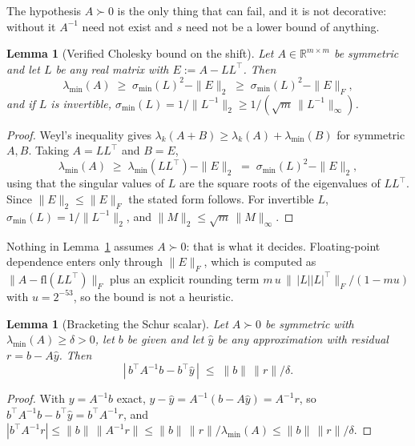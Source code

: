 \documentclass[11pt,a4paper]{article}
\theoremstyle{plain}
\newtheorem{lemma}[theorem]{Lemma}
\theoremstyle{definition}
\theoremstyle{remark}
\newcommand{\abs}[1]{\left\lvert #1\right\rvert}
\newcommand{\R}{\mathbb{R}}
\begin{document}
The hypothesis $A\succ0$ is the only thing that can fail, and it is not decorative:
without it $A^{-1}$ need not exist and $s$ need not be a lower bound of anything.

\begin{lemma}[Verified Cholesky bound on the shift]
\label{lem:cholesky}
Let $A\in\R^{m\times m}$ be symmetric and let $L$ be any real matrix with
$E := A-LL^\top$. Then
\[
  \lambda_{\min}(A) \;\ge\; \sigma_{\min}(L)^{2} - \|E\|_2
  \;\ge\; \sigma_{\min}(L)^{2} - \|E\|_F ,
\]
and if $L$ is invertible, $\sigma_{\min}(L)=1/\|L^{-1}\|_2 \ge 1/(\sqrt m\,\|L^{-1}\|_\infty)$.
\end{lemma}
\begin{proof}
Weyl's inequality gives $\lambda_k(A+B)\ge \lambda_k(A)+\lambda_{\min}(B)$ for
symmetric $A,B$. Taking $A=LL^\top$ and $B=E$,
\[
  \lambda_{\min}(A) \;\ge\; \lambda_{\min}(LL^\top) - \|E\|_2
  \;=\; \sigma_{\min}(L)^{2} - \|E\|_2 ,
\]
using that the singular values of $L$ are the square roots of the eigenvalues of
$LL^\top$. Since $\|E\|_2\le\|E\|_F$ the stated form follows. For invertible $L$,
$\sigma_{\min}(L)=1/\|L^{-1}\|_2$, and $\|M\|_2\le\sqrt m\,\|M\|_\infty$.
\end{proof}

Nothing in Lemma~\ref{lem:cholesky} assumes $A\succ0$: that is what it decides.
Floating-point dependence enters only through $\|E\|_F$, which is computed as
$\|A-\mathrm{fl}(LL^\top)\|_F$ plus an explicit rounding term
$m\,u\,\bigl\|\,\abs{L}\abs{L}^\top\bigr\|_F/(1-mu)$ with $u=2^{-53}$, so the bound
is not a heuristic.

\begin{lemma}[Bracketing the Schur scalar]
\label{lem:bracket}
Let $A\succ0$ be symmetric with $\lambda_{\min}(A)\ge\delta>0$, let $b$ be given and
let $\hat y$ be any approximation with residual $r=b-A\hat y$. Then
\[
  \abs{\,b^\top A^{-1}b - b^\top\hat y\,} \;\le\; \|b\|\,\|r\|/\delta .
\]
\end{lemma}
\begin{proof}
With $y=A^{-1}b$ exact, $y-\hat y=A^{-1}(b-A\hat y)=A^{-1}r$, so
$b^\top A^{-1}b-b^\top\hat y=b^\top A^{-1}r$, and
$\abs{b^\top A^{-1}r}\le\|b\|\,\|A^{-1}r\|\le\|b\|\,\|r\|/\lambda_{\min}(A)\le
\|b\|\,\|r\|/\delta$.
\end{proof}
\end{document}
